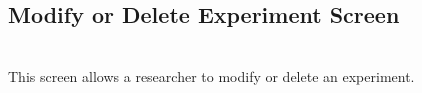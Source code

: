 \subsection{Modify or Delete Experiment Screen}
\setlength\fboxsep{0pt}
\setlength\fboxrule{0.5pt}
\\
This screen allows a researcher to modify or delete an experiment.

